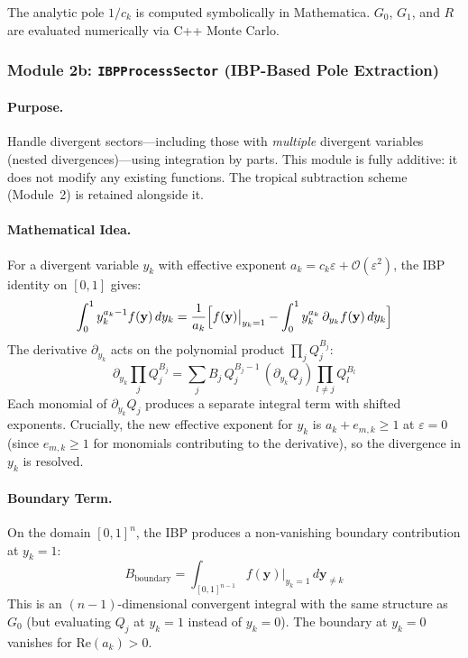 \documentclass[11pt,a4paper]{article}
\begin{document}
The analytic pole $1/c_k$ is computed symbolically in Mathematica. $G_0$, $G_1$, and $R$ are evaluated numerically via C++ Monte Carlo.

\subsubsection{Module 2b: \texttt{IBPProcessSector} (IBP-Based Pole Extraction)}

\paragraph{Purpose.} Handle divergent sectors---including those with \emph{multiple} divergent variables (nested divergences)---using integration by parts.  This module is fully additive: it does not modify any existing functions.  The tropical subtraction scheme (Module~2) is retained alongside it.

\paragraph{Mathematical Idea.}
For a divergent variable $y_k$ with effective exponent $a_k = c_k\varepsilon + \mathcal{O}(\varepsilon^2)$, the IBP identity on $[0,1]$ gives:
\begin{equation}
\int_0^1 y_k^{a_k-1} f(\mathbf{y})\,dy_k
= \frac{1}{a_k}\Bigl[f(\mathbf{y})\big|_{y_k=1} - \int_0^1 y_k^{a_k}\,\partial_{y_k} f(\mathbf{y})\,dy_k\Bigr]
\end{equation}
The derivative $\partial_{y_k}$ acts on the polynomial product $\prod_j Q_j^{B_j}$:
\begin{equation}
\partial_{y_k}\prod_j Q_j^{B_j} = \sum_j B_j\,Q_j^{B_j-1}\,(\partial_{y_k}Q_j)\prod_{l\neq j}Q_l^{B_l}
\end{equation}
Each monomial of $\partial_{y_k}Q_j$ produces a separate integral term with shifted exponents.  Crucially, the new effective exponent for $y_k$ is $a_k + e_{m,k} \geq 1$ at $\varepsilon=0$ (since $e_{m,k}\geq 1$ for monomials contributing to the derivative), so the divergence in $y_k$ is resolved.

\paragraph{Boundary Term.}
On the domain $[0,1]^n$, the IBP produces a non-vanishing boundary contribution at $y_k=1$:
\begin{equation}
B_{\mathrm{boundary}} = \int_{[0,1]^{n-1}} f(\mathbf{y})\big|_{y_k=1}\,d\mathbf{y}_{\neq k}
\end{equation}
This is an $(n{-}1)$-dimensional convergent integral with the same structure as $G_0$ (but evaluating $Q_j$ at $y_k=1$ instead of $y_k=0$).  The boundary at $y_k=0$ vanishes for $\mathrm{Re}(a_k)>0$.
\end{document}
